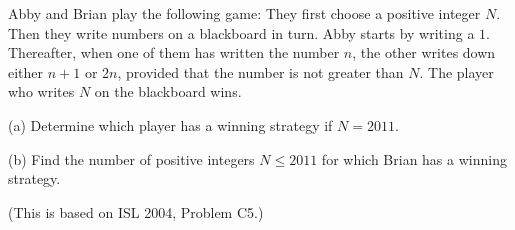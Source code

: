 Abby and Brian play the following game: They first choose a positive integer $N$. Then they write numbers on a blackboard in turn. Abby starts by writing a $1$. Thereafter, when one of them has written the number $n$,  the other writes down either $n + 1$ or $2n$,  provided that the number is not greater than $N$. The player who writes $N$ on the blackboard wins.

(a) Determine which player has a winning strategy if $N = 2011$.

(b) Find the number of positive integers $N\leqslant2011$ for which Brian has a winning strategy.

(This is based on ISL 2004, Problem C5.)